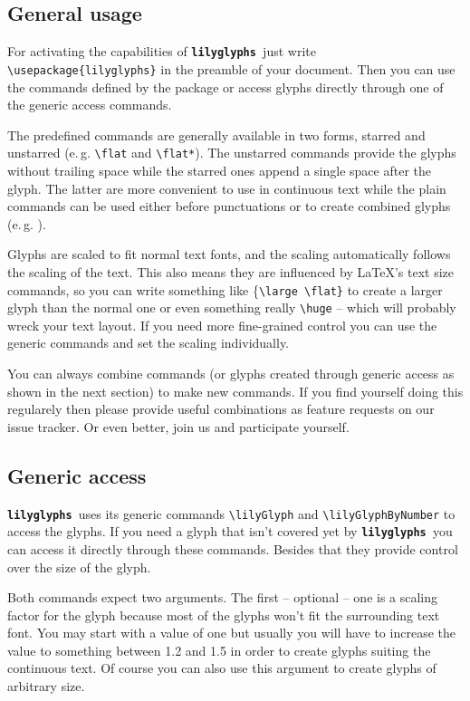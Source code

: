 \documentclass{article}
\newcommand{\lilyglyphs}{\texttt{\textbf{lilyglyphs }}}
\newcommand*{\cmd}[1]{\texttt{\textbackslash #1}}
\begin{document}
\subsection{General usage}
For activating the capabilities of \lilyglyphs just write \cmd{usepackage\{lilyglyphs\}} in the preamble of your document. Then you can use the commands defined by the package or access glyphs directly through one of the generic access commands.

The predefined commands are generally available in two forms, starred and unstarred (e.\,g. \cmd{flat} and \cmd{flat*}). The unstarred commands provide the glyphs without trailing space while the starred ones append a single space after the glyph. The latter are more convenient to use in continuous text while the plain commands can be used either before punctuations or to create combined glyphs (e.\,g. \lilyS\lilyF\lilyF\lilyZ).

Glyphs are scaled to fit normal text fonts, and the scaling automatically follows the scaling of the text. This also means they are influenced by \LaTeX 's text size commands, so you can write something like \{\cmd{large \textbackslash flat\}} to create a larger {\large \flat} glyph than the normal \flat* one or even something really \cmd{huge} {\huge \lilySFZ} -- which will probably wreck your text layout. If you need more fine-grained control you can use the generic commands and set the scaling individually.

You can always combine commands (or glyphs created through generic access as shown in the next section) to make new commands. If you find yourself doing this regularely then please provide useful combinations as feature requests on our issue tracker. Or even better, join us and participate yourself.



\subsection{Generic access}
\lilyglyphs uses its generic commands \cmd{lilyGlyph} and \cmd{lilyGlyphByNumber} to access the glyphs. If you need a glyph that isn't covered yet by \lilyglyphs you can access it directly through these commands. Besides that they provide control over the size of the glyph.

Both commands expect two arguments. The first -- optional -- one is a scaling factor for the glyph because most of the glyphs won't fit the surrounding text font. You may start with a value of one but usually you will have to increase the value to something between 1.2 and 1.5 in order to create glyphs suiting the continuous text. Of course you can also use this argument to create glyphs of arbitrary size. 
\end{document}
